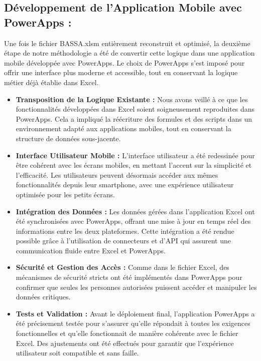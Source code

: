 \documentclass[a4paper, oneside, 12pt, final]{extreport}
\begin{document}
\subsection{Développement de l'Application Mobile avec PowerApps :}
Une fois le fichier BASSA.xlsm entièrement reconstruit et optimisé, la deuxième étape de notre méthodologie a été de convertir cette logique dans une application mobile développée avec PowerApps. Le choix de PowerApps s'est imposé pour offrir une interface plus moderne et accessible, tout en conservant la logique métier déjà établie dans Excel.
\begin{itemize}


\item \textbf{Transposition de la Logique Existante :} Nous avons veillé à ce que les fonctionnalités développées dans Excel soient soigneusement reproduites dans PowerApps. Cela a impliqué la réécriture des formules et des scripts dans un environnement adapté aux applications mobiles, tout en conservant la structure de données sous-jacente.

\item \textbf{Interface Utilisateur Mobile :} L'interface utilisateur a été redessinée pour être cohérent avec les écrans mobiles, en mettant l'accent sur la simplicité et l'efficacité. Les utilisateurs peuvent désormais accéder aux mêmes fonctionnalités depuis leur smartphone, avec une expérience utilisateur optimisée pour les petits écrans.

\item \textbf{Intégration des Données :} Les données gérées dans l'application Excel ont été synchronisées avec PowerApps, offrant une mise à jour en temps réel des informations entre les deux plateformes. Cette intégration a été rendue possible grâce à l'utilisation de connecteurs et d'API qui assurent une communication fluide entre Excel et PowerApps.

\item \textbf{Sécurité et Gestion des Accès :} Comme dans le fichier Excel, des mécanismes de sécurité stricts ont été implémentés dans PowerApps pour confirmer que seules les personnes autorisées puissent accéder et manipuler les données critiques.

\item \textbf{Tests et Validation :} Avant le déploiement final, l'application PowerApps a été précisement testée pour s'assurer qu'elle répondait à toutes les exigences fonctionnelles et qu'elle fonctionnait de manière cohérente avec le fichier Excel. Des ajustements ont été effectués pour garantir que l'expérience utilisateur soit compatible et sans faille.
\end{itemize}
\end{document}
